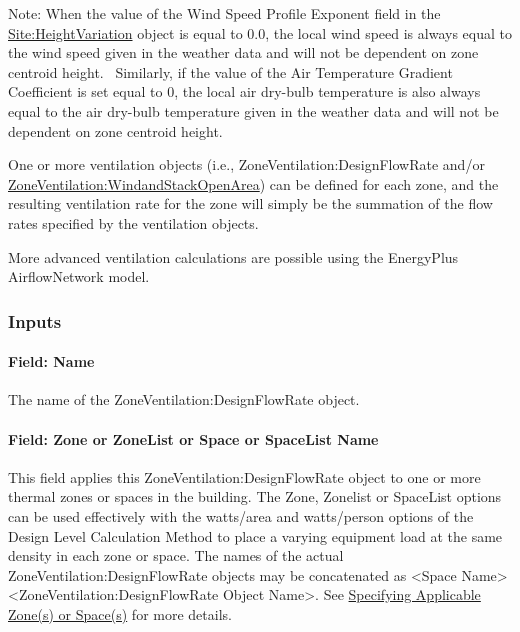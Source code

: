 Note: When the value of the Wind Speed Profile Exponent field in the \hyperref[siteheightvariation]{Site:HeightVariation} object is equal to 0.0, the local wind speed is always equal to the wind speed given in the weather data and will not be dependent on zone centroid height.~ Similarly, if the value of the Air Temperature Gradient Coefficient is set equal to 0, the local air dry-bulb temperature is also always equal to the air dry-bulb temperature given in the weather data and will not be dependent on zone centroid height.

One or more ventilation objects (i.e., ZoneVentilation:DesignFlowRate and/or \hyperref[zoneventilationwindandstackopenarea]{ZoneVentilation:WindandStackOpenArea}) can be defined for each zone, and the resulting ventilation rate for the zone will simply be the summation of the flow rates specified by the ventilation objects.

More advanced ventilation calculations are possible using the EnergyPlus AirflowNetwork model.

\subsubsection{Inputs}\label{inputs-2016-06-17-0936}

\paragraph{Field: Name}\label{field-name-2016-06-16}

The name of the ZoneVentilation:DesignFlowRate object.

\paragraph{Field: Zone or ZoneList or Space or SpaceList Name}\label{field-zone-or-zonelist-name-1}

This field applies this ZoneVentilation:DesignFlowRate object to one or more thermal zones or spaces in the building. The Zone, Zonelist or SpaceList options can be used effectively with the watts/area and watts/person options of the Design Level Calculation Method to place a varying equipment load at the same density in each zone or space. The names of the actual ZoneVentilation:DesignFlowRate objects may be concatenated as \textless{}Space Name\textgreater{} \textless{}ZoneVentilation:DesignFlowRate Object Name\textgreater{}. See \hyperref[specifying-applicable-zones-or-spaces]{Specifying Applicable Zone(s) or Space(s)} for more details.

